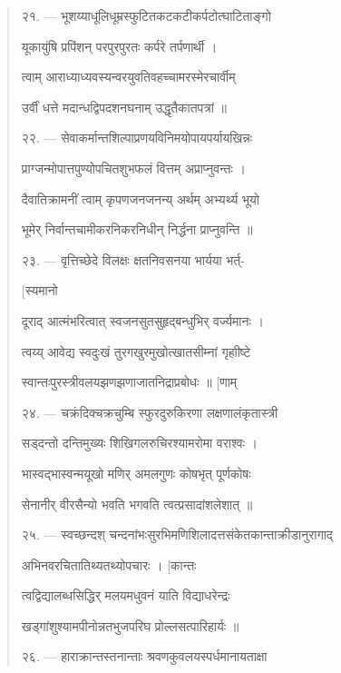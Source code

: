 \documentclass[a4paper, 11pt, oneside, french]{article}
\begin{document}
\begin{quotation}
\texthindi{२१}. --- \texthindi{भूशय्याधूलिधूम्रस्फुटितकटकटीकर्पटोत्घाटिताङ्गो}

\texthindi{यूकायुंषि प्रपिंशन् परपुरपुरतः कर्परे तर्पणार्थी ।}

\texthindi{त्वाम् आराध्याध्यवस्यन्वरयुवतिवहच्चामरस्मेरचार्वीम्}

\texthindi{उर्वीं धत्ते मदान्धद्विपदशनघनाम् उद्धृतैकातपत्रां ॥}

\bigskip

\texthindi{२२}. --- \texthindi{सेवाकर्मान्तशिल्पाप्रणयविनिमयोपायपर्यायखिन्नः}

\texthindi{प्राग्जन्मोपात्तपुण्योपचितशुभफलं वित्तम् अप्राप्नुवन्तः ।}

\texthindi{दैवातिक्रामनीं त्वाम् कृपणजनजनन्य् अर्थम् अभ्यर्थ्य भूयो}

\texthindi{भूमेर् निर्वान्तचामीकरनिकरनिधीन् निर्द्धना प्राप्नुवन्ति ॥}

\bigskip

\texthindi{२३}. --- \texthindi{वृत्तिच्छेदे विलक्षः क्षतनिवसनया भार्यया भर्त्-}

\hspace*{65mm}\texthindi{[स्यमानो}

\texthindi{दूराद् आत्मंभरित्वात् स्वजनसुतसुहृद्बन्धुभिर् वर्ज्यमानः ।}

\texthindi{त्वय्य् आवेद्य स्वदुःखं तुरगखुरमुखोत्खातसीम्नां गृहाीष्टे}

\texthindi{स्वान्तःपुरस्त्रीवलयझणझणाजातनिद्राप्रबोधः ॥ [णाम्}

\bigskip

\texthindi{२४}. --- \texthindi{चक्रंदिक्चक्रचुम्बि स्फुरदुरुकिरणा लक्षणालंकृतास्त्री}

\texthindi{सड्दन्तो दन्तिमुख्यः शिखिगलरुचिरश्यामरोमा वराश्वः ।}

\texthindi{भास्वद्भास्वन्मयूखो मणिर् अमलगुणः कोषभृत् पूर्णकोषः}

\texthindi{सेनानीर् वीरसैन्यो भवति भगवति त्वत्प्रसादांशलेशात् ॥}

\bigskip

\texthindi{२५}. --- \texthindi{स्वच्छन्दश् चन्दनांभःसुरभिमणिशिलादत्तसंकेतकान्ताक्रीडानुरागाद्}

\texthindi{अभिनवरचितातिथ्यतथ्योपचारः । [कान्तः}

\texthindi{त्वद्विद्यालब्धसिद्धिर् मलयमधुवनं याति विद्याधरेन्द्रः}

\texthindi{खड्गांशुश्यामपीनोन्नतभुजपरिघ प्रोल्लसत्पारिहार्यः ॥}

\bigskip

\texthindi{२६}. --- \texthindi{हाराक्रान्तस्तनान्ताः श्रवणकुवलयस्पर्धमानायताक्षा}


\end{quotation}
\end{document}
